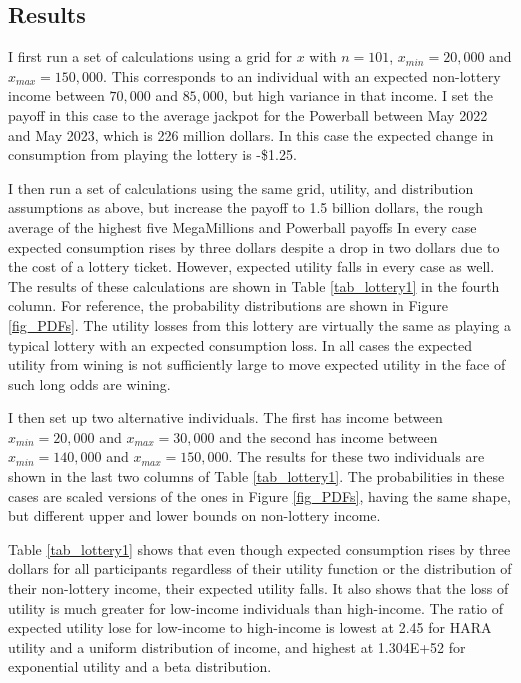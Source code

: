 \documentclass[letterpaper,12pt]{article}
\numberwithin{equation}{section}
\numberwithin{figure}{section}
\numberwithin{table}{section}
\begin{document}
\begin{spacing}{1.5}
\section{Results} \label{sec_results}

	I first run a set of calculations using a grid for $x$ with $n=101$, $x_{min} = 20,000$ and $x_{max} = 150,000$.  This corresponds to an individual with an expected non-lottery income between $70,000$ and $85,000$, but high variance in that income.  I set the payoff in this case to the average jackpot for the Powerball between May 2022 and May 2023, which is 226 million dollars.  In this case the expected change in consumption from playing the lottery is -\$1.25.

	I then run a set of calculations using the same grid, utility, and distribution assumptions as above, but increase the payoff to 1.5 billion dollars, the rough average of the highest five MegaMillions and Powerball payoffs  In every case expected consumption rises by three dollars despite a drop in two dollars due to the cost of a lottery ticket.  However, expected utility falls in every case as well.  The results of these calculations are shown in Table \ref{tab_lottery1} in the fourth column.  For reference, the probability distributions are shown in Figure \ref{fig_PDFs}.  The utility losses from this lottery are virtually the same as playing a typical lottery with an expected consumption loss.  In all cases the expected utility from wining is not sufficiently large to move expected utility in the face of such long odds are wining.

	I then set up two alternative individuals.  The first has income between $x_{min} = 20,000$ and $x_{max} = 30,000$ and the second has income between $x_{min} = 140,000$ and $x_{max} = 150,000$.  The results for these two individuals are shown in the last two columns of Table \ref{tab_lottery1}.  The probabilities in these cases are scaled versions of the ones in Figure \ref{fig_PDFs}, having the same shape, but different upper and lower bounds on non-lottery income.

	Table \ref{tab_lottery1} shows that even though expected consumption rises by three dollars for all participants regardless of their utility function or the distribution of their non-lottery income, their expected utility falls.  It also shows that the loss of utility is much greater for low-income individuals than high-income.  The ratio of expected utility lose for low-income to high-income is lowest at 2.45 for HARA utility and a uniform distribution of income, and highest at 1.304E+52 for exponential utility and a beta distribution.


\end{spacing}
\end{document}
